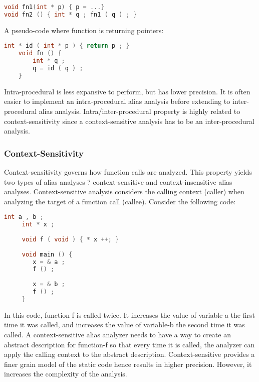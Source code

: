 \begin{lstlisting}[language=C]
void fn1(int * p) { p = ...}
void fn2 () { int * q ; fn1 ( q ) ; }
\end{lstlisting}


A pseudo-code where function is returning pointers:
\begin{lstlisting}[language=C]
    int * id ( int * p ) { return p ; }
    void fn () {
        int * q ;
        q = id ( q ) ;
    }
\end{lstlisting}

Intra-procedural is less expansive to perform, but has lower precision. It is often easier to
implement an intra-procedural alias analysis before extending to inter-procedural alias analysis.
Intra/inter-procedural property is highly related to context-sensitivity since a context-sensitive
analysis has to be an inter-procedural analysis.


\subsubsection{Context-Sensitivity}
Context-sensitivity governs how function calls are analyzed. This property yields two types of
alias analyses ? context-sensitive and context-insensitive alias analyses. Context-sensitive analysis
considers the calling context (caller) when analyzing the target of a function call (callee). Consider
the following code:


\begin{lstlisting}[language=C]
     int a , b ;
     int * x ;
    
     void f ( void ) { * x ++; }
    
     void main () {
        x = & a ;
        f () ;
        
        x = & b ;
        f () ;
     }
\end{lstlisting}



In this code, function-f is called twice. It increases the value of variable-a the first time it
was called, and increases the value of variable-b the second time it was called. A context-sensitive
alias analyzer needs to have a way to create an abstract description for function-f so that every
time it is called, the analyzer can apply the calling context to the abstract description.
Context-sensitive provides a finer grain model of the static code hence results in higher precision. However, it increases the complexity of the analysis.





